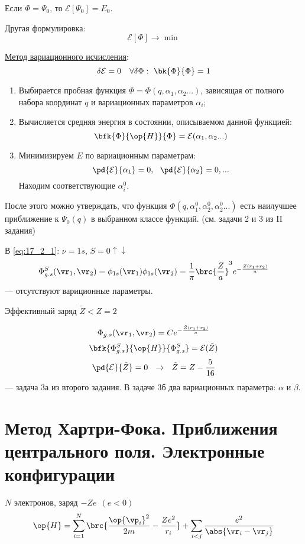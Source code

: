 Если $\Phi = \Psi_0$, то $\mathcal{E}[\Psi_0] = E_0$. 

Другая формулировка:
\begin{equation}
\label{eq:18_1_3}
\mathcal{E}[\Phi] \to \min
\end{equation}

\underline{Метод вариационного исчисления}:
\begin{equation}
\label{eq:18_1_4}
\delta \mathcal{E} = 0 ~~~ \forall \delta\Phi:~ \bk{\Phi}{\Phi} = 1
\end{equation}

\begin{enumerate}
\item Выбирается пробная функция $\Phi = \Phi(q, \alpha_1, \alpha_2 ... )$, зависящая от полного набора координат $q$ и вариационных параметров $\alpha_i$;
\item Вычисляется средняя энергия в состоянии, описываемом данной функцией:
$$
\bfk{\Phi}{\op{H}}{\Phi} = \mathcal{E}(\alpha_1, \alpha_2 ...)
$$
\item Минимизируем $E$ по вариационным параметрам:
$$
\pd{\mathcal{E}}{\alpha_1} = 0,~~ \pd{\mathcal{E}}{\alpha_2} = 0, ... 
$$
Находим соответствующие $\alpha_i^0$.
\end{enumerate}
После этого можно утверждать, что функция $\Phi(q, \alpha_1^0, \alpha_2^0, \alpha_2^0 ...)$ есть наилучшее приближение к $\Psi_0(q)$ в выбранном классе функций. (см. задачи 2 и 3 из II задания)

В \eqref{eq:17_2_1}: $\nu = 1s$, $S = 0 \uparrow \downarrow$
\begin{equation}
\label{eq:18_1_5}
\Phi_{g.s}^{S}(\vr_1, \vr_2) = \phi_{1s}(\vr_1)\phi_{1s}(\vr_2) = \frac{1}{\pi} \brc{\frac{Z}{a}}^3 e^{-\frac{Z(r_1 + r_2)}{a}}
\end{equation}
--- отсутствуют вариционные параметры.

Эффективный заряд $\tilde{Z} < Z = 2$

\begin{equation}
\label{eq:18_1_6}
\Phi_{g.s}(\vr_1, \vr_2) = C e^{-\frac{\tilde{Z}(r_1 + r_2)}{a}}
\end{equation}
$$
\bfk{\Phi_{g.s}^{S}}{\op{H}}{\Phi_{g.s}^{S}} = \mathcal{E}(\tilde{Z})
$$
$$
\pd{\mathcal{E}}{\tilde{Z}} = 0 ~~\to~~ \tilde{Z} = Z - \frac{5}{16}
$$
--- задача 3а из второго задания. В задаче 3б два вариационных параметра: $\alpha$ и $\beta$.

\section{Метод Хартри-Фока. Приближения центрального поля. Электронные конфигурации}
$N$ электронов, заряд $-Ze~~ (e<0)$
\begin{equation}
\label{eq:18_2_1}
\op{H} = \sum_{i=1}^{N} \brc{\frac{\op{\vp_i}^2}{2m} - \frac{Ze^2}{r_i}} + \sum_{i<j} \frac{e^2}{\abs{\vr_i - \vr_j}}
\end{equation}

